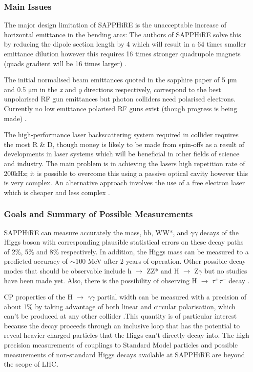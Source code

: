 \subsubsection{Main Issues}
The major design limitation of SAPPHiRE is the unacceptable increase of horizontal emittance in the bending arcs: The authors of SAPPHiRE solve this by reducing the dipole section length by 4 which will result in a 64 times smaller emittance dilution however this requires 16 times stronger quadrupole magnets (quads gradient will be 16 times larger) \cite{Telnov:Photons}.

The initial normalised beam emittances quoted in the sapphire paper of 5 μm and 0.5 μm in the \textit{x} and \textit{y} directions respectively, correspond to the best unpolarised RF gun emittances but photon colliders need polarised electrons. Currently no low emittance polarised RF guns exist (though progress is being made) \cite{Telnov:Photons:MIT}.

The high-performance laser backscattering system required in collider requires the most R \& D, though money is likely to be made from spin-offs as a result of developments in laser systems which will be beneficial in other fields of science and industry. The main problem is in achieving the lasers high repetition rate of 200kHz; it is possible to overcome this using a passive optical cavity however this is very complex. An alternative approach involves the use of a free electron laser which is cheaper and less complex \cite{Zimmermann:TLEP}.

\subsubsection{Goals and Summary of Possible Measurements}
SAPPHiRE can measure accurately the mass, bb, WW*, and $\gamma\gamma$ decays of the Higgs boson with corresponding plausible statistical errors on these decay paths of 2\%, 5\% and 8\% respectively. In addition, the Higgs mass can be measured to a predicted accuracy of $\sim$100 MeV after 2 years of operation. Other possible decay modes that should be observable include h $\rightarrow$ ZZ* and H $\rightarrow$ Z$\gamma$ but no studies have been made yet. Also, there is the possibility of observing H $\rightarrow$ $\tau^{+}\tau^{-}$ decay \cite{Bogacz:SAPPHiRE}.

CP properties of the H $\rightarrow$ $\gamma\gamma$ partial width can be measured with a precision of about 1\% by taking advantage of both linear and circular polarisation, which can't be produced at any other collider \cite{Chou:Higgs}.This quantity is of particular interest because the decay proceeds through an inclusive loop that has the potential to reveal heavier charged particles that the Higgs can't directly decay into. The high precision measurements of couplings to Standard Model particles and possible measurements of non-standard Higgs decays available at SAPPHiRE are beyond the scope of LHC.

